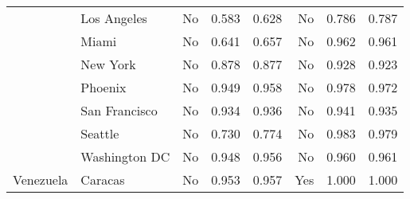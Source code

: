 \begin{tabular}{ l l r r r r r r  }
& Los Angeles &       No &  0.583 &  0.628 &       No &  0.786 &  0.787 \\
& Miami &       No &  0.641 &  0.657 &       No &  0.962 &  0.961 \\
& New York &       No &  0.878 &  0.877 &       No &  0.928 &  0.923 \\
& Phoenix &       No &  0.949 &  0.958 &       No &  0.978 &  0.972 \\
& San Francisco &       No &  0.934 &  0.936 &       No &  0.941 &  0.935 \\
& Seattle &       No &  0.730 &  0.774 &       No &  0.983 &  0.979 \\
& Washington DC &       No &  0.948 &  0.956 &       No &  0.960 &  0.961 \\
Venezuela & Caracas &       No &  0.953 &  0.957 &      Yes &  1.000 &  1.000 \\
\bottomrule
\end{tabular}